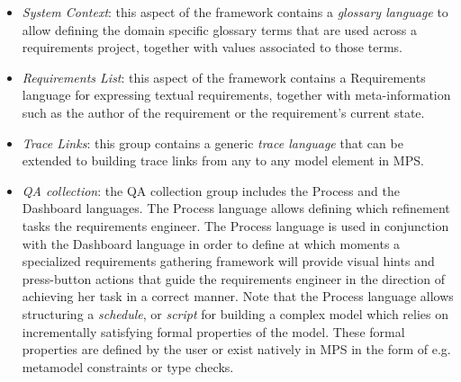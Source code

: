 \begin{itemize}
  \item \emph{System Context}: this aspect of the framework contains a
  \emph{glossary language} to allow defining the domain specific glossary terms that are used across a
  requirements project, together with values associated to those
  terms.
  \item \emph{Requirements List}: this aspect of the framework contains a
  \textsf{Requirements} language for expressing textual requirements, together with meta-information
  such as the author of the requirement or the requirement's current state.
  \item \emph{Trace Links}: this group contains a generic \emph{trace
  language} that can be extended to building trace links from any to any model
  element in MPS.
  \item \emph{QA collection}: the QA collection group includes the
  \textsf{Process} and the \textsf{Dashboard} languages. The \textsf{Process}
  language allows defining which refinement tasks the requirements engineer.
  The \textsf{Process} language is used in conjunction with the
  \textsf{Dashboard} language in order to define at which moments a specialized requirements
  gathering framework will provide visual hints and press-button actions that
  guide the requirements engineer in the direction of achieving her task in a
  correct manner. Note that the \textsf{Process} language allows structuring a
  \emph{schedule}, or \emph{script} for building a complex model which relies on
  incrementally satisfying formal properties of the model. These formal
  properties are defined by the user or exist natively in MPS in the form of
  e.g. metamodel constraints or type checks.
\end{itemize}

